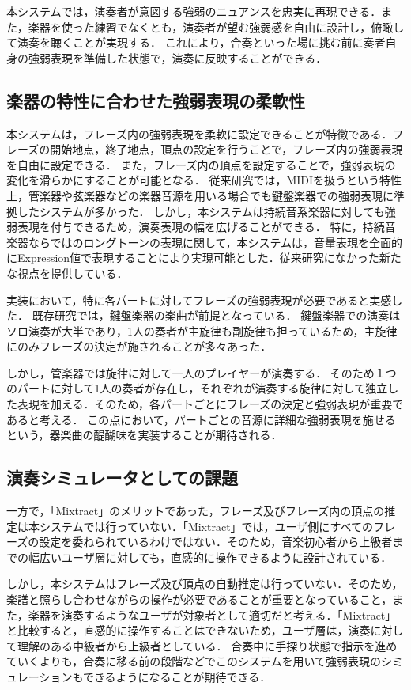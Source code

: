 本システムでは，演奏者が意図する強弱のニュアンスを忠実に再現できる．また，楽器を使った練習でなくとも，演奏者が望む強弱感を自由に設計し，俯瞰して演奏を聴くことが実現する．
これにより，合奏といった場に挑む前に奏者自身の強弱表現を準備した状態で，演奏に反映することができる．



\subsection{楽器の特性に合わせた強弱表現の柔軟性}
本システムは，フレーズ内の強弱表現を柔軟に設定できることが特徴である．フレーズの開始地点，終了地点，頂点の設定を行うことで，フレーズ内の強弱表現を自由に設定できる．
また，フレーズ内の頂点を設定することで，強弱表現の変化を滑らかにすることが可能となる．
従来研究では，MIDIを扱うという特性上，管楽器や弦楽器などの楽器音源を用いる場合でも鍵盤楽器での強弱表現に準拠したシステムが多かった．
しかし，本システムは持続音系楽器に対しても強弱表現を付与できるため，演奏表現の幅を広げることができる．
特に，持続音楽器ならではのロングトーンの表現に関して，本システムは，音量表現を全面的にExpression値で表現することにより実現可能とした．従来研究になかった新たな視点を提供している．


実装において，特に各パートに対してフレーズの強弱表現が必要であると実感した．
既存研究では，鍵盤楽器の楽曲が前提となっている．
鍵盤楽器での演奏はソロ演奏が大半であり，1人の奏者が主旋律も副旋律も担っているため，主旋律にのみフレーズの決定が施されることが多々あった．

しかし，管楽器では旋律に対して一人のプレイヤーが演奏する．
そのため１つのパートに対して1人の奏者が存在し，それぞれが演奏する旋律に対して独立した表現を加える．そのため，各パートごとにフレーズの決定と強弱表現が重要であると考える．
この点において，パートごとの音源に詳細な強弱表現を施せるという，器楽曲の醍醐味を実装することが期待される．

\subsection{演奏シミュレータとしての課題}
一方で，「Mixtract」のメリットであった，フレーズ及びフレーズ内の頂点の推定は本システムでは行っていない．「Mixtract」では，ユーザ側にすべてのフレーズの設定を委ねられているわけではない．そのため，音楽初心者から上級者までの幅広いユーザ層に対しても，直感的に操作できるように設計されている．

しかし，本システムはフレーズ及び頂点の自動推定は行っていない．そのため，楽譜と照らし合わせながらの操作が必要であることが重要となっていること，また，楽器を演奏するようなユーザが対象者として適切だと考える．「Mixtract」と比較すると，直感的に操作することはできないため，ユーザ層は，演奏に対して理解のある中級者から上級者としている．
合奏中に手探り状態で指示を進めていくよりも，合奏に移る前の段階などでこのシステムを用いて強弱表現のシミュレーションもできるようになることが期待できる．

